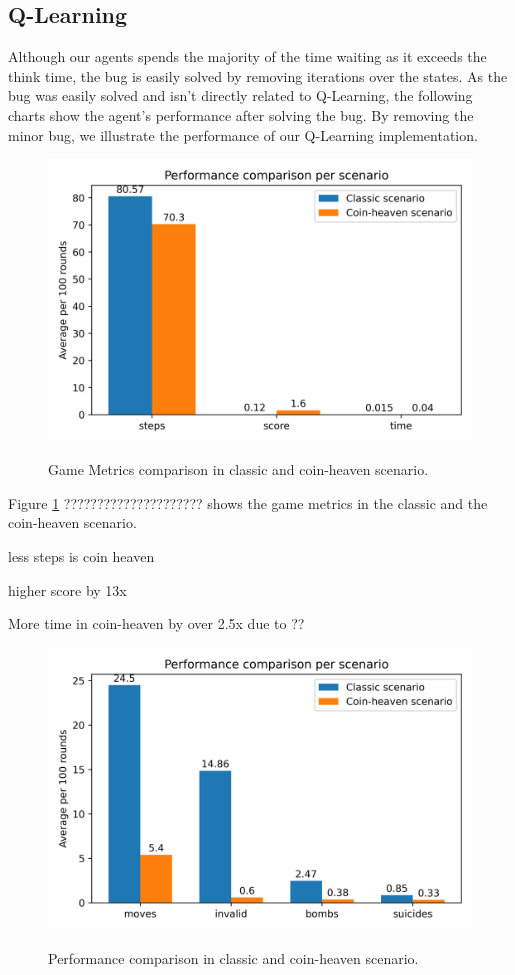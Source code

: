 \documentclass[
	letterpaper, %
	10pt, %
]{CSUniSchoolLabReport}
\begin{document}
\subsection{Q-Learning}
Although our agents spends the majority of the time waiting as it exceeds the
think time, the bug is easily solved by removing iterations over the states.
As the bug was easily solved and isn't directly related to Q-Learning, the
following charts show the agent's performance after solving the bug. By removing the
minor bug, we illustrate the performance of our Q-Learning implementation.

\begin{figure}[H]
	\centering
	\includegraphics[scale=0.6]{Figures/metrics.png}
	\label{img:metrics}
	\caption{Game Metrics comparison in classic and coin-heaven scenario.}
\end{figure}

Figure \ref{img:metrics} ????????????????????? shows the game metrics in the classic and the coin-heaven
scenario.

less steps is coin heaven

higher score by 13x

More time in coin-heaven by over 2.5x
due to ??

\begin{figure}[H]
	\centering
	\includegraphics[scale=0.6]{Figures/game.png}
	\label{img:game}
	\caption{Performance comparison in classic and coin-heaven scenario.}
\end{figure}
\end{document}
